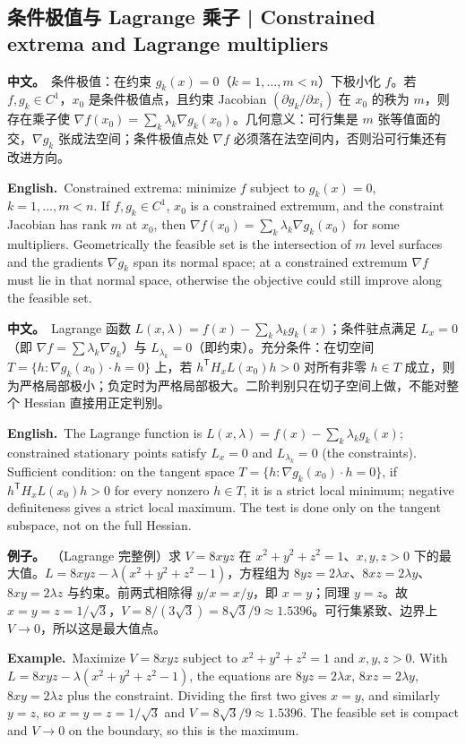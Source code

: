 \documentclass[UTF8,11pt,a4paper]{ctexart}
\newcommand{\BOTH}[2]{\par\noindent\textbf{中文。}\ #1\par\noindent\textbf{English.}\ #2\par}
\newcommand{\EX}[2]{\par\noindent\textbf{例子。}\ #1\par\noindent\textbf{Example.}\ #2\par}
\begin{document}
\subsection{条件极值与 Lagrange 乘子 | Constrained extrema and Lagrange multipliers}
\BOTH{条件极值：在约束 $g_k(x)=0$（$k=1,\ldots,m<n$）下极小化 $f$。若 $f,g_k\in C^1$，$x_0$ 是条件极值点，且约束 Jacobian $(\partial g_k/\partial x_i)$ 在 $x_0$ 的秩为 $m$，则存在乘子使 $\nabla f(x_0)=\sum_k\lambda_k\nabla g_k(x_0)$。几何意义：可行集是 $m$ 张等值面的交，$\nabla g_k$ 张成法空间；条件极值点处 $\nabla f$ 必须落在法空间内，否则沿可行集还有改进方向。}{Constrained extrema: minimize $f$ subject to $g_k(x)=0$, $k=1,\ldots,m<n$. If $f,g_k\in C^1$, $x_0$ is a constrained extremum, and the constraint Jacobian has rank $m$ at $x_0$, then $\nabla f(x_0)=\sum_k\lambda_k\nabla g_k(x_0)$ for some multipliers. Geometrically the feasible set is the intersection of $m$ level surfaces and the gradients $\nabla g_k$ span its normal space; at a constrained extremum $\nabla f$ must lie in that normal space, otherwise the objective could still improve along the feasible set.}
\BOTH{Lagrange 函数 $L(x,\lambda)=f(x)-\sum_k\lambda_kg_k(x)$；条件驻点满足 $L_x=0$（即 $\nabla f=\sum\lambda_k\nabla g_k$）与 $L_{\lambda_k}=0$（即约束）。充分条件：在切空间 $T=\{h:\nabla g_k(x_0)\cdot h=0\}$ 上，若 $h^{\mathsf T}H_xL(x_0)h>0$ 对所有非零 $h\in T$ 成立，则为严格局部极小；负定时为严格局部极大。二阶判别只在切子空间上做，不能对整个 Hessian 直接用正定判别。}{The Lagrange function is $L(x,\lambda)=f(x)-\sum_k\lambda_kg_k(x)$; constrained stationary points satisfy $L_x=0$ and $L_{\lambda_k}=0$ (the constraints). Sufficient condition: on the tangent space $T=\{h:\nabla g_k(x_0)\cdot h=0\}$, if $h^{\mathsf T}H_xL(x_0)h>0$ for every nonzero $h\in T$, it is a strict local minimum; negative definiteness gives a strict local maximum. The test is done only on the tangent subspace, not on the full Hessian.}
\EX{（Lagrange 完整例）求 $V=8xyz$ 在 $x^2+y^2+z^2=1$、$x,y,z>0$ 下的最大值。$L=8xyz-\lambda(x^2+y^2+z^2-1)$，方程组为 $8yz=2\lambda x$、$8xz=2\lambda y$、$8xy=2\lambda z$ 与约束。前两式相除得 $y/x=x/y$，即 $x=y$；同理 $y=z$。故 $x=y=z=1/\sqrt3$，$V=8/(3\sqrt3)=8\sqrt3/9\approx1.5396$。可行集紧致、边界上 $V\to0$，所以这是最大值点。}{Maximize $V=8xyz$ subject to $x^2+y^2+z^2=1$ and $x,y,z>0$. With $L=8xyz-\lambda(x^2+y^2+z^2-1)$, the equations are $8yz=2\lambda x$, $8xz=2\lambda y$, $8xy=2\lambda z$ plus the constraint. Dividing the first two gives $x=y$, and similarly $y=z$, so $x=y=z=1/\sqrt3$ and $V=8\sqrt3/9\approx1.5396$. The feasible set is compact and $V\to0$ on the boundary, so this is the maximum.}
\end{document}
